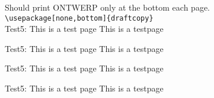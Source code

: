 \documentclass[a4paper,dutch]{article}
\newcommand{\xx}{
Test5: This is a test page \thepage \vfill
This is a testpage \thepage \newpage
}
\begin{document}
Should print ONTWERP only at the bottom each page.\\
\verb|\usepackage[none,bottom]{draftcopy}|\\
\xx\xx\xx\xx
\end{document}

